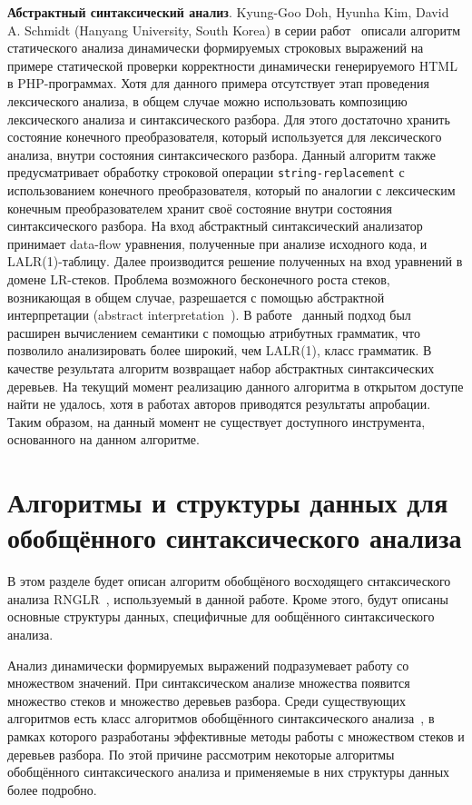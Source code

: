 \textbf{Абстрактный синтаксический анализ}. Kyung-Goo Doh,  Hyunha Kim, David A. Schmidt (Hanyang University, South Korea) в серии работ~\cite{LrAbstract1, LrAbstract2, LRAbstractParsingSema} описали алгоритм статического анализа динамически формируемых строковых выражений на примере статической проверки корректности динамически генерируемого HTML в PHP-программах. Хотя для данного примера отсутствует этап проведения лексического анализа, в общем случае можно использовать композицию лексического анализа и синтаксического разбора. Для этого достаточно хранить состояние конечного преобразователя, который используется для лексического анализа, внутри состояния синтаксического разбора. Данный алгоритм также предусматривает обработку строковой операции \verb|string-replacement| с использованием конечного преобразователя, который по аналогии с лексическим конечным преобразователем хранит своё состояние внутри состояния синтаксического разбора. На вход абстрактный синтаксический анализатор принимает data-flow  уравнения, полученные при анализе исходного кода, и  LALR(1)-таблицу. Далее производится решение полученных на вход уравнений в домене LR-стеков.  Проблема возможного бесконечного роста стеков, возникающая в общем случае, разрешается с помощью абстрактной интерпретации (abstract interpretation~\cite{AbstractInterpretation}). В работе~\cite{LRAbstractParsingSema} данный подход был расширен вычислением семантики с помощью атрибутных грамматик, что позволило анализировать более широкий, чем LALR(1), класс грамматик. В качестве результата алгоритм возвращает набор абстрактных синтаксических деревьев. На текущий момент реализацию данного алгоритма в открытом доступе найти не удалось, хотя в работах авторов приводятся результаты апробации. Таким образом, на данный момент не существует доступного инструмента, основанного на данном алгоритме.

\section{Алгоритмы и структуры данных для обобщённого синтаксического анализа}

В этом разделе будет описан алгоритм обобщёного восходящего снтаксического анализа RNGLR~\cite{RNGLR}, используемый в данной работе. Кроме этого, будут описаны основные структуры данных, специфичные для ообщённого синтаксического анализа.

Анализ динамически формируемых выражений подразумевает работу со множеством значений. При синтаксическом анализе множества появится множество стеков и множество деревьев разбора. Среди существующих алгоритмов есть класс алгоритмов обобщённого синтаксического анализа~\cite{GeneralisedlrBIG}, в рамках которого разработаны эффективные методы работы с множеством стеков и деревьев разбора. По этой причине рассмотрим некоторые алгоритмы обобщённого синтаксического анализа и применяемые в них структуры данных более подробно.


